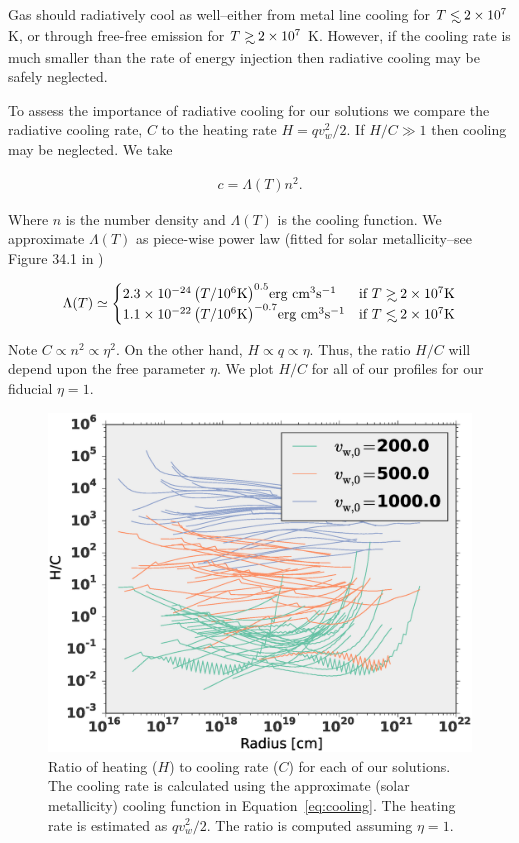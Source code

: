 \documentclass[usenatbib,fleqn]{mn2e}
\newcommand\lsim{\mathrel{\rlap{\lower4pt\hbox{\hskip1pt$\sim$}}
    \raise1pt\hbox{$<$}}}
\newcommand\gsim{\mathrel{\rlap{\lower4pt\hbox{\hskip1pt$\sim$}}
    \raise1pt\hbox{$>$}}}
\newcommand{\vw}{v_w}
\begin{document}
Gas should radiatively cool as well--either from metal line cooling
for $T\lsim 2\times 10^7$ K, or through free-free emission for $T\gsim
2\times 10^7$ K.  However, if the cooling rate is much smaller than
the rate of energy injection then radiative cooling may be safely
neglected.

To assess the importance of radiative cooling for our solutions we
compare the radiative cooling rate, $C$ to the heating rate $H=q
\vw^2/2$. If $H/C \gg 1$ then cooling may be neglected. We take

\begin{align}
  c=\Lambda(T) n^2.
\end{align}

Where $n$ is the number density and $\Lambda(T)$ is the cooling
function. We approximate $\Lambda(T)$ as piece-wise power law (fitted
for solar metallicity--see Figure 34.1 in \cite{Draine:2011a})


\begin{align}
  \Lambda(T)\simeq
  \begin{cases}
    2.3 \times 10^{-24} \left(T/10^6 \text{K}\right)^{0.5} $erg cm$^3 $s$^{-1}& \text{if } T \gsim 2 \times 10^7 \text{K} \\
    1.1 \times 10^{-22} \left(T/10^6 \text{K}\right)^{-0.7}  $erg cm$^3 $s$^{-1}& \text{if } T \lsim 2 \times 10^7 \text{K}     
  \end{cases}
  \label{eq:cooling}
\end{align}

Note $C\propto n^2\propto \eta^2$. On the other hand, $H \propto q
\propto \eta$. Thus, the ratio $H/C$ will depend upon the free
parameter $\eta$. We plot $H/C$ for all of our profiles for our
fiducial $\eta=1$.

\begin{figure}
  \includegraphics[width=\columnwidth]{cooling.eps}
  \caption{\label{fig:cooling} Ratio of heating ($H$) to cooling rate ($C$) for each of our solutions. The cooling rate is calculated using the approximate (solar metallicity) cooling function in Equation~\ref{eq:cooling}. The heating rate is estimated as $q \vw^2/2$. The ratio is computed assuming $\eta=1$.}
\end{figure}
\end{document}
